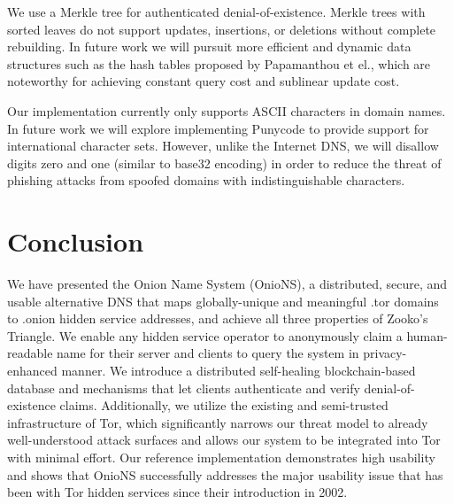\documentclass{sig-alternate}
\begin{document}
We use a Merkle tree for authenticated denial-of-existence. Merkle trees with sorted leaves do not support updates, insertions, or deletions without complete rebuilding. In future work we will pursuit more efficient and dynamic data structures such as the hash tables proposed by Papamanthou et el.\cite{papamanthou2008authenticated}, which are noteworthy for achieving constant query cost and sublinear update cost.

Our implementation currently only supports ASCII characters in domain names. In future work we will explore implementing Punycode to provide support for international character sets. However, unlike the Internet DNS, we will disallow digits zero and one (similar to base32 encoding) in order to reduce the threat of phishing attacks from spoofed domains with indistinguishable characters.

\section{Conclusion}

We have presented the Onion Name System (OnioNS), a distributed, secure, and usable alternative DNS that maps globally-unique and meaningful .tor domains to .onion hidden service addresses, and achieve all three properties of Zooko's Triangle. We enable any hidden service operator to anonymously claim a human-readable name for their server and clients to query the system in privacy-enhanced manner. We introduce a distributed self-healing blockchain-based database and mechanisms that let clients authenticate and verify denial-of-existence claims. Additionally, we utilize the existing and semi-trusted infrastructure of Tor, which significantly narrows our threat model to already well-understood attack surfaces and allows our system to be integrated into Tor with minimal effort. Our reference implementation demonstrates high usability and shows that OnioNS successfully addresses the major usability issue that has been with Tor hidden services since their introduction in 2002.

%
\end{document}
